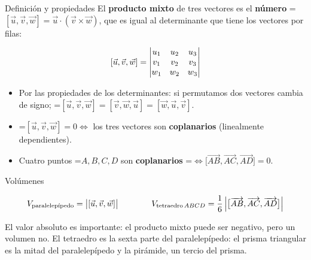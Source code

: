 \documentclass[11pt,a4paper]{article}
\newcommand{\fmm}[1]{\setbox0=\hbox{$#1$}\ifdim\wd0>\linewidth\fmdisp{#1}\else\mbox{\box0}\fi}
\newcommand{\fmdisp}[1]{\[\setbox2=\hbox{$\displaystyle #1$}\ifdim\wd2>\linewidth\resizebox{\linewidth}{!}{\box2}\else\box2\fi\]}
\begin{document}
\begin{fmdef}{Definición y propiedades}
El \textbf{producto mixto} de tres vectores es el \textbf{número} \fmm{[\vec u,\vec v,\vec w]=\vec u\cdot(\vec v\times\vec w)}, que es igual al determinante que tiene los vectores por filas:

\fmdisp{[\vec u,\vec v,\vec w]=\begin{vmatrix}u_1&u_2&u_3\\v_1&v_2&v_3\\w_1&w_2&w_3\end{vmatrix}}
\newpage
\begin{itemize}
\item Por las propiedades de los determinantes: si permutamos dos vectores cambia de signo; \fmm{[\vec u,\vec v,\vec w]=[\vec v,\vec w,\vec u]=[\vec w,\vec u,\vec v]}.
\item \fmm{[\vec u,\vec v,\vec w]=0\iff} los tres vectores son \textbf{coplanarios} (linealmente dependientes).
\item Cuatro puntos \fmm{A,B,C,D} son \textbf{coplanarios} \fmm{\iff\big[\overrightarrow{AB},\overrightarrow{AC},\overrightarrow{AD}\big]=0}.
\end{itemize}
\end{fmdef}

\begin{fmprop}{Volúmenes}

\fmdisp{V_{\text{paralelepípedo}}=\big|[\vec u,\vec v,\vec w]\big|\qquad\qquad V_{\text{tetraedro}\,ABCD}=\dfrac16\,\Big|\big[\overrightarrow{AB},\overrightarrow{AC},\overrightarrow{AD}\big]\Big|}

El valor absoluto es importante: el producto mixto puede ser negativo, pero un volumen no. El tetraedro es la sexta parte del paralelepípedo: el prisma triangular es la mitad del paralelepípedo y la pirámide, un tercio del prisma.
\end{fmprop}
\end{document}
